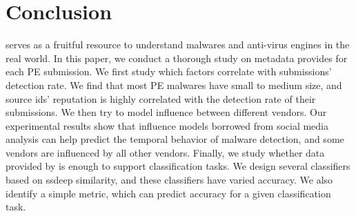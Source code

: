 \section{Conclusion}
\label{sec:con}

\vt{} serves as a fruitful resource to understand malwares and anti-virus engines in the real world. 
In this paper, 
we conduct a thorough study on metadata \vt{} provides for each PE submission. 
We first study which factors correlate with submissions' detection rate. 
We find that most PE malwares have small to medium size, 
and source ids' reputation is highly correlated with the detection rate of their submissions. 
We then try to model influence between different vendors. 
Our experimental results show that   
influence models borrowed from social media analysis can help predict the temporal behavior of malware detection, 
and some vendors are influenced by all other vendors.
Finally, we study whether data provided by \vt{} is enough to support classification tasks. 
We design several classifiers based on ssdeep similarity, and these classifiers have varied accuracy. 
We also identify a simple metric, which can predict accuracy for a given classification
task.